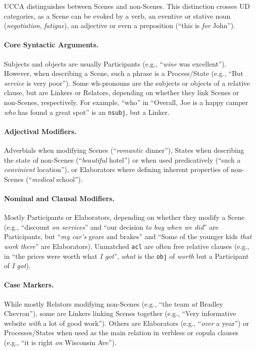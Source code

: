 \documentclass[11pt,a4paper]{article}
\begin{document}
UCCA distinguishes between Scenes and non-Scenes.
This distinction crosses UD categories,
as a Scene can be evoked by a verb, an eventive or stative
noun (\textit{negotiation}, \textit{fatigue}),
an adjective or even a preposition (``this is \textit{for} John'').

\paragraph{Core Syntactic Arguments.}
      Subjects and objects are usually Participants (e.g., ``\textit{wine} was excellent'').
      However, when describing a Scene, such a phrase is a Process/State
      (e.g., ``But \textit{service} is very poor'').
      Some wh-pronouns are the subjects or objects of a relative clause, but
      are Linkers or Relators,
      depending on whether they link Scenes or non-Scenes, respectively.
      For example, ``who'' in ``Overall, Joe is a happy camper \textit{who} has found a great spot'' is an \texttt{nsubj}, but a Linker.

\paragraph{Adjectival Modifiers.} Adverbials when modifying Scenes
    (``\textit{romantic} dinner''), States when describing the state of
    non-Scenes (``\textit{beautiful} hotel'') or when used predicatively (``such a \textit{convinient} location''), or
    Elaborators where defining inherent properties of non-Scenes (``\textit{medical} school'').

\paragraph{Nominal and Clausal Modifiers.}
    Mostly Participants or Elaborators,
    depending on whether they modify a Scene (e.g.,
    ``discount \textit{on services}'' and
    ``our decision \textit{to buy when we did}'' are Participants,
    but ``\textit{my car's} gears and brakes'' and ``Some of the younger kids \textit{that work there}'' are Elaborators).
    Unmatched \texttt{acl} are often
    free relative clauses (e.g., in ``the prices were worth what \textit{I got}'',
    \textit{what} is the \texttt{obj} of \textit{worth} but
    a Participant of \textit{I got}).

\paragraph{Case Markers.}
      While mostly Relators
      modifying non-Scenes (e.g., ``the team \textit{at} Bradley Chevron''),
      some are Linkers linking Scenes together 
      (e.g., ``Very informative website \textit{with} a lot of good work'').
      Others are Elaborators (e.g., ``\textit{over} a year'') or Processes/States
      when used as the main relation in verbless or copula clauses
      (e.g., ``it is right \textit{on} Wisconsin Ave'').
    
\end{document}
